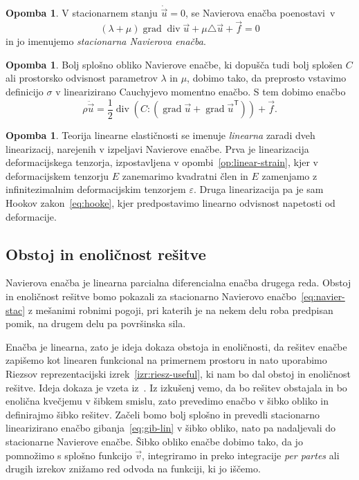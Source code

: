 \documentclass[12pt,a4paper,twoside]{article}
\theoremstyle{definition} %
\newtheorem{opomba}[definicija]{Opomba}
\theoremstyle{plain} %
\numberwithin{equation}{section}
\newcommand{\T}{\mathsf{T}}
\newcommand{\lap}{\triangle}
\renewcommand{\div}{\operatorname{div}}
\newcommand{\grad}{\operatorname{grad}}
\newcommand{\eps}{\varepsilon}
\newcommand{\vv}{\vec{v}}
\newcommand{\vu}{\vec{u}}
\newcommand{\vf}{\vec{f}}
\newcommand{\ts}{\sigma}
\begin{document}
\begin{opomba}
  V stacionarnem stanju $\dot{\vu} = 0$, se Navierova enačba poenostavi~v
  \begin{equation}
    (\lambda + \mu)\grad\div \vu + \mu \lap \vu + \vf  = 0
  \label{eq:navier-stac}
\end{equation}
in jo imenujemo \emph{stacionarna Navierova enačba}.
\end{opomba}
\begin{opomba}
  Bolj splošno obliko Navierove enačbe, ki dopušča tudi bolj splošen $C$ ali prostorsko odvisnost
  parametrov $\lambda$ in $\mu$, dobimo tako, da preprosto vstavimo definicijo $\ts$ v linearizirano
  Cauchyjevo momentno enačbo. S tem dobimo enačbo
  \begin{equation}
    \rho\ddot \vu = \frac12 \div(C:(\grad \vu + \grad\vu^\T)) + \vf.
    \label{eq:navier-general}
  \end{equation}
\end{opomba}
\begin{opomba}
  Teorija linearne elastičnosti se imenuje \emph{linearna} zaradi dveh linearizacij,
  narejenih v izpeljavi Navierove enačbe. Prva je linearizacija deformacijskega tenzorja,
  izpostavljena v opombi~\ref{op:linear-strain}, kjer v deformacijskem tenzorju $E$ zanemarimo
  kvadratni člen in $E$ zamenjamo z infinitezimalnim deformacijskim tenzorjem $\eps$. Druga
  linearizacija pa je sam Hookov zakon~\eqref{eq:hooke}, kjer predpostavimo linearno odvisnost
  napetosti od deformacije.
\end{opomba}

\subsection{Obstoj in enoličnost rešitve}
\label{sec:obstoj-enol}
Navierova enačba je linearna parcialna diferencialna enačba drugega reda.
Obstoj in enoličnost rešitve bomo pokazali za stacionarno Navierovo
enačbo~\eqref{eq:navier-stac} z mešanimi robnimi pogoji, pri katerih je na nekem
delu roba predpisan pomik, na drugem delu pa površinska sila.

Enačba je linearna, zato je ideja dokaza obstoja in enoličnosti, da rešitev enačbe zapišemo kot
linearen funkcional na primernem prostoru in nato uporabimo Riezsov reprezentacijski
izrek~\ref{izr:riesz-useful}, ki nam bo dal obstoj in enoličnost rešitve. Ideja dokaza je
vzeta iz~\cite[izrek 3.17.1, str.\ 232]{lebedev2009introduction}. Iz izkušenj vemo, da bo rešitev
obstajala in bo enolična kvečjemu v šibkem smislu, zato prevedimo enačbo v šibko obliko in
definirajmo šibko rešitev. Začeli bomo bolj splošno in prevedli stacionarno
linearizirano enačbo gibanja~\eqref{eq:gib-lin} v šibko obliko, nato pa nadaljevali do stacionarne
Navierove enačbe. Šibko obliko enačbe dobimo tako, da jo pomnožimo s splošno funkcijo $\vv$,
integriramo in preko integracije \emph{per partes} ali drugih izrekov znižamo red odvoda na
funkciji, ki jo iščemo.
\end{document}
